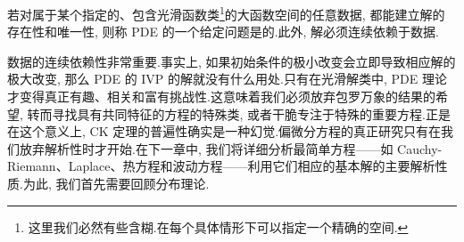 \begin{definition*}
若对属于某个指定的、包含光滑函数类\footnote{这里我们必然有些含糊.在每个具体情形下可以指定一个精确的空间.}的大函数空间的任意数据, 都能建立解的存在性和唯一性, 则称 PDE 的一个给定问题是的.此外, 解必须连续依赖于数据.
\end{definition*}

数据的连续依赖性非常重要.事实上, 如果初始条件的极小改变会立即导致相应解的极大改变, 那么 PDE 的 IVP 的解就没有什么用处.只有在光滑解类中, PDE 理论才变得真正有趣、相关和富有挑战性.这意味着我们必须放弃包罗万象的结果的希望, 转而寻找具有共同特征的方程的特殊类, 或者干脆专注于特殊的重要方程.正是在这个意义上, CK 定理的普遍性确实是一种幻觉.偏微分方程的真正研究只有在我们放弃解析性时才开始.在下一章中, 我们将详细分析最简单方程——如 Cauchy-Riemann、Laplace、热方程和波动方程——利用它们相应的基本解的主要解析性质.为此, 我们首先需要回顾分布理论.